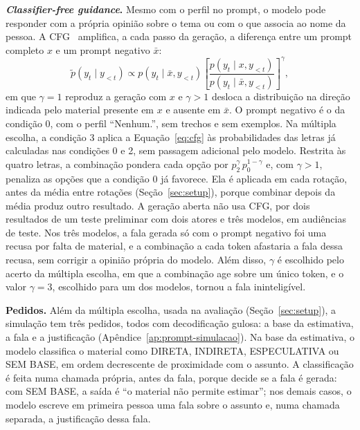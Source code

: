 \textbf{\textit{Classifier-free guidance}.} Mesmo com o perfil no prompt, o modelo pode responder com a
própria opinião sobre o tema ou com o que associa ao nome da pessoa. A
CFG~\citep{ho2022classifier,sanchez2024stay} amplifica, a cada passo da geração, a diferença entre um
prompt completo $x$ e um prompt negativo $\bar{x}$:
\begin{equation}
  \tilde{p}(y_t \mid y_{<t}) \propto p(y_t \mid \bar{x}, y_{<t})
  \left[ \frac{p(y_t \mid x, y_{<t})}{p(y_t \mid \bar{x}, y_{<t})} \right]^{\gamma},
  \label{eq:cfg}
\end{equation}
em que $\gamma = 1$ reproduz a geração com $x$ e $\gamma > 1$ desloca a distribuição na direção
indicada pelo material presente em $x$ e ausente em $\bar{x}$. O prompt negativo é o da condição 0,
com o perfil ``Nenhum.'', sem trechos e sem exemplos. Na múltipla escolha, a condição 3 aplica a
Equação~\ref{eq:cfg} às probabilidades das letras já calculadas nas condições 0 e 2, sem passagem
adicional pelo modelo. Restrita às quatro letras, a combinação pondera cada opção por
$p_2^{\gamma}\, p_0^{1-\gamma}$ e, com $\gamma > 1$, penaliza as opções que a condição 0 já favorece.
Ela é aplicada em cada rotação, antes da média entre rotações (Seção~\ref{sec:setup}), porque
combinar depois da média produz outro resultado. A geração aberta não usa CFG, por dois resultados
de um teste preliminar com dois atores e três modelos, em audiências de teste. Nos três modelos, a
fala gerada só com o prompt negativo foi uma recusa por falta de material, e a combinação a cada
token afastaria a fala dessa recusa, sem corrigir a opinião própria do modelo. Além disso, $\gamma$ é
escolhido pelo acerto da múltipla escolha, em que a combinação age sobre um único token, e o valor
$\gamma = 3$, escolhido para um dos modelos, tornou a fala ininteligível.

\textbf{Pedidos.} Além da múltipla escolha, usada na avaliação (Seção~\ref{sec:setup}), a simulação
tem três pedidos, todos com decodificação gulosa: a base da estimativa, a fala e a justificação
(Apêndice~\ref{ap:prompt-simulacao}). Na base da estimativa, o modelo classifica o material como
DIRETA, INDIRETA, ESPECULATIVA ou SEM BASE, em ordem decrescente de proximidade com o assunto. A classificação
é feita numa chamada própria, antes da fala, porque decide se a fala é gerada: com SEM BASE, a saída
é ``o material não permite estimar''; nos demais casos, o modelo escreve em primeira pessoa uma fala
sobre o assunto e, numa chamada separada, a justificação dessa fala.

